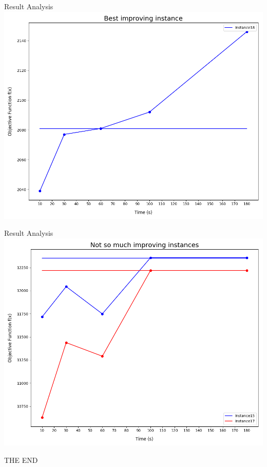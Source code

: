 \documentclass[12pt]{beamer}
\begin{document}
  \begin{frame}[fragile]{Result Analysis}
    \includegraphics[scale=0.4]{res/bestImproving}
  \end{frame}

  \begin{frame}[fragile]{Result Analysis}
    \includegraphics[scale=0.4]{res/notMuchImproving}
  \end{frame}

  \begin{frame}[standout]
  	THE END
  \end{frame}
\end{document}
